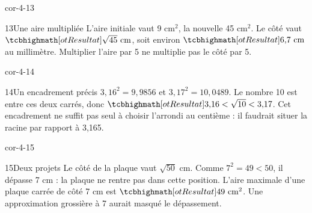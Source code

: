 \begin{blocLivre}{cor-4-13}\begin{corrige}{13}{Une aire multipliée}
L’aire initiale vaut 9 cm$^2$, la nouvelle 45 cm$^2$. Le côté vaut $\res{\sqrt{45}\ \mathrm{cm}}$, soit environ $\res{6{,}7\ \mathrm{cm}}$ au millimètre. Multiplier l’aire par 5 ne multiplie pas le côté par 5.
\label{fig-cor-4-13}
\end{corrige}\end{blocLivre}
\begin{blocLivre}{cor-4-14}\begin{corrige}{14}{Un encadrement précis}
$3{,}16^2=9{,}9856$ et $3{,}17^2=10{,}0489$. Le nombre 10 est entre ces deux carrés, donc $\res{3{,}16<\sqrt{10}<3{,}17}$. Cet encadrement ne suffit pas seul à choisir l’arrondi au centième : il faudrait situer la racine par rapport à 3,165.
\end{corrige}\end{blocLivre}
\begin{blocLivre}{cor-4-15}\begin{corrige}{15}{Deux projets}
Le côté de la plaque vaut $\sqrt{50}$ cm. Comme $7^2=49<50$, il dépasse 7 cm : la plaque ne rentre pas dans cette position. L’aire maximale d’une plaque carrée de côté 7 cm est $\res{49\ \mathrm{cm}^2}$. Une approximation grossière à 7 aurait masqué le dépassement.
\label{fig-cor-4-15}
\end{corrige}\end{blocLivre}
